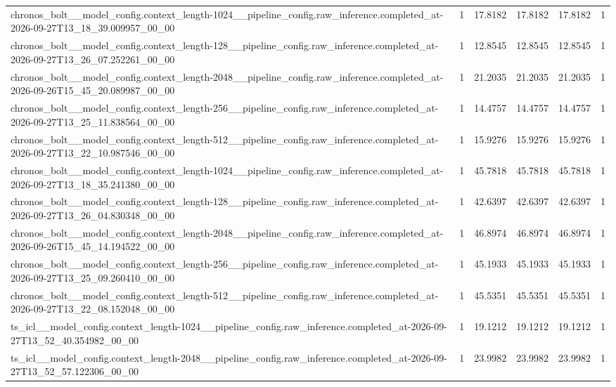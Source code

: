 \begin{tabular}{llllll}
chronos\_bolt\_\_model\_config.context\_length-1024\_\_pipeline\_config.raw\_inference.completed\_at-2026-09-27T13\_18\_39.009957\_00\_00 & 1 & 17.8182 & 17.8182 & 17.8182 & 1 \\
chronos\_bolt\_\_model\_config.context\_length-128\_\_pipeline\_config.raw\_inference.completed\_at-2026-09-27T13\_26\_07.252261\_00\_00 & 1 & 12.8545 & 12.8545 & 12.8545 & 1 \\
chronos\_bolt\_\_model\_config.context\_length-2048\_\_pipeline\_config.raw\_inference.completed\_at-2026-09-26T15\_45\_20.089987\_00\_00 & 1 & 21.2035 & 21.2035 & 21.2035 & 1 \\
chronos\_bolt\_\_model\_config.context\_length-256\_\_pipeline\_config.raw\_inference.completed\_at-2026-09-27T13\_25\_11.838564\_00\_00 & 1 & 14.4757 & 14.4757 & 14.4757 & 1 \\
chronos\_bolt\_\_model\_config.context\_length-512\_\_pipeline\_config.raw\_inference.completed\_at-2026-09-27T13\_22\_10.987546\_00\_00 & 1 & 15.9276 & 15.9276 & 15.9276 & 1 \\
chronos\_bolt\_\_model\_config.context\_length-1024\_\_pipeline\_config.raw\_inference.completed\_at-2026-09-27T13\_18\_35.241380\_00\_00 & 1 & 45.7818 & 45.7818 & 45.7818 & 1 \\
chronos\_bolt\_\_model\_config.context\_length-128\_\_pipeline\_config.raw\_inference.completed\_at-2026-09-27T13\_26\_04.830348\_00\_00 & 1 & 42.6397 & 42.6397 & 42.6397 & 1 \\
chronos\_bolt\_\_model\_config.context\_length-2048\_\_pipeline\_config.raw\_inference.completed\_at-2026-09-26T15\_45\_14.194522\_00\_00 & 1 & 46.8974 & 46.8974 & 46.8974 & 1 \\
chronos\_bolt\_\_model\_config.context\_length-256\_\_pipeline\_config.raw\_inference.completed\_at-2026-09-27T13\_25\_09.260410\_00\_00 & 1 & 45.1933 & 45.1933 & 45.1933 & 1 \\
chronos\_bolt\_\_model\_config.context\_length-512\_\_pipeline\_config.raw\_inference.completed\_at-2026-09-27T13\_22\_08.152048\_00\_00 & 1 & 45.5351 & 45.5351 & 45.5351 & 1 \\
ts\_icl\_\_model\_config.context\_length-1024\_\_pipeline\_config.raw\_inference.completed\_at-2026-09-27T13\_52\_40.354982\_00\_00 & 1 & 19.1212 & 19.1212 & 19.1212 & 1 \\
ts\_icl\_\_model\_config.context\_length-2048\_\_pipeline\_config.raw\_inference.completed\_at-2026-09-27T13\_52\_57.122306\_00\_00 & 1 & 23.9982 & 23.9982 & 23.9982 & 1 \\

\end{tabular}
